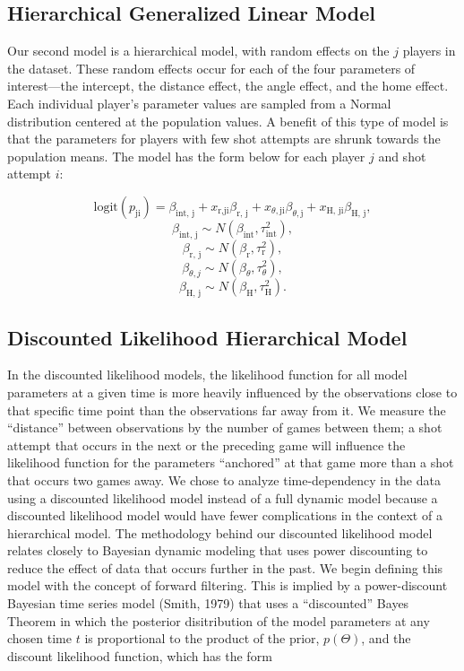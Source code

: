 \documentclass[12pt,twoside]{dukestatscithesis}
\theoremstyle{definition}
\theoremstyle{definition}
\theoremstyle{definition}
\theoremstyle{remark}
\begin{document}
\subsection{Hierarchical Generalized Linear
Model}\label{hierarchical-generalized-linear-model}

Our second model is a hierarchical model, with random effects on the
\(\textit{j}\) players in the dataset. These random effects occur for
each of the four parameters of interest---the intercept, the distance
effect, the angle effect, and the home effect. Each individual player's
parameter values are sampled from a Normal distribution centered at the
population values. A benefit of this type of model is that the
parameters for players with few shot attempts are shrunk towards the
population means. The model has the form below for each player \(j\) and
shot attempt \(i\):

\[
\text{logit}(p_{\text{ji}}) = 
\beta_{\text{int, j}} +
x_{\text{r,ji}}\beta_{\text{r, j}} +
x_{\theta,\text{ji}}\beta_{\theta, \text{j}} +
x_{\text{H, ji}}\beta_{\text{H, j}},
\] \[
\beta_{\text{int, j}} \sim N(\beta_{\text{int}}, \tau^2_{\text{int}}),
\] \[
\beta_{\text{r, j}} \sim N(\beta_{\text{r}}, \tau^2_{\text{r}}),
\] \[
\beta_{\theta, j} \sim N(\beta_{\theta}, \tau^2_{\theta}),
\] \[
\beta_{\text{H, j}} \sim N(\beta_{\text{H}}, \tau^2_{\text{H}}).
\]

\subsection{Discounted Likelihood Hierarchical
Model}\label{discounted-likelihood-hierarchical-model}

In the discounted likelihood models, the likelihood function for all
model parameters at a given time is more heavily influenced by the
observations close to that specific time point than the observations far
away from it. We measure the ``distance'' between observations by the
number of games between them; a shot attempt that occurs in the next or
the preceding game will influence the likelihood function for the
parameters ``anchored'' at that game more than a shot that occurs two
games away. We chose to analyze time-dependency in the data using a
discounted likelihood model instead of a full dynamic model because a
discounted likelihood model would have fewer complications in the
context of a hierarchical model. The methodology behind our discounted
likelihood model relates closely to Bayesian dynamic modeling that uses
power discounting to reduce the effect of data that occurs further in
the past. We begin defining this model with the concept of forward
filtering. This is implied by a power-discount Bayesian time series
model (Smith, 1979) that uses a ``discounted'' Bayes Theorem in which
the posterior disitribution of the model parameters at any chosen time
\(t\) is proportional to the product of the prior, \(p(\Theta)\), and
the discount likelihood function, which has the form
\end{document}
